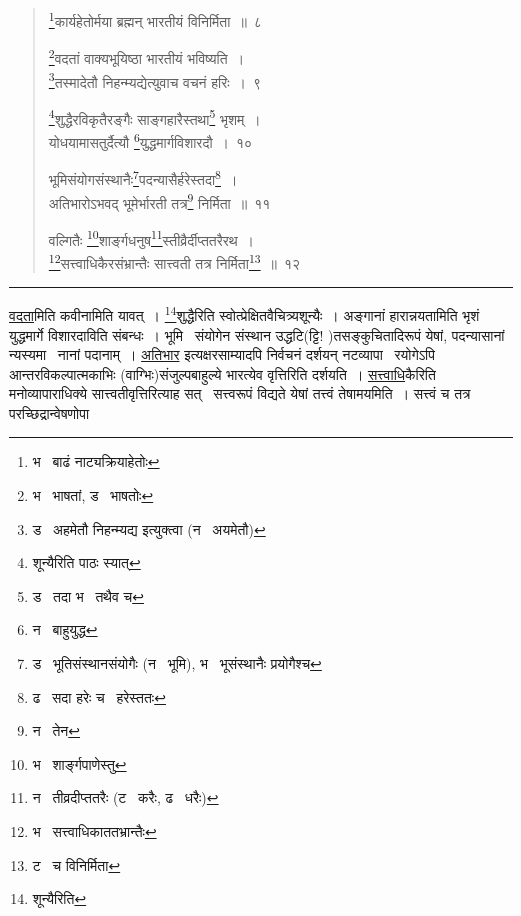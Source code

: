 \documentclass[11pt, openany]{book}
\begin{document}
\newpage

\begin{quote}
{\na \renewcommand{\thefootnote}{1}\footnote{भ \textendash\ बाढं नाट्यक्रियाहेतोः}कार्यहेतोर्मया ब्रह्मन् भारतीयं विनिर्मिता~॥~८

\renewcommand{\thefootnote}{2}\footnote{भ \textendash\ भाषतां, ड \textendash\ भाषतोः}वदतां वाक्यभूयिष्ठा भारतीयं भविष्यति~।\\
\renewcommand{\thefootnote}{3}\footnote{ड \textendash\ अहमेतौ निहन्म्यद्य इत्युक्त्वा (न \textendash\ अयमेतौ)}तस्मादेतौ निहन्म्यद्येत्युवाच वचनं हरिः~।~९

\renewcommand{\thefootnote}{4}\footnote{शून्यैरिति पाठः स्यात्}शुद्धैरविकृतैरङ्गैः साङ्गहारैस्तथा\renewcommand{\thefootnote}{5}\footnote{ड \textendash\ तदा भ \textendash\ तथैव च} भृशम्~।\\
योधयामासतुर्दैत्यौ \renewcommand{\thefootnote}{6}\footnote{न \textendash\ बाहुयुद्ध}युद्धमार्गविशारदौ~।~१०

भूमिसंयोगसंस्थानैः\renewcommand{\thefootnote}{7}\footnote{ड \textendash\ भूतिसंस्थानसंयोगैः (न \textendash\ भूमि), भ \textendash\ भूसंस्थानैः प्रयोगैश्च}पदन्यासैर्हरेस्तदा\renewcommand{\thefootnote}{8}\footnote{ढ \textendash\ सदा हरेः च \textendash\ हरेस्ततः}~।\\
अतिभारोऽभवद् भूमेर्भारती तत्र\renewcommand{\thefootnote}{9}\footnote{न \textendash\ तेन} निर्मिता~॥~११

वल्गितैः \renewcommand{\thefootnote}{10}\footnote{भ \textendash\ शार्ङ्गपाणेस्तु}शार्ङ्गधनुष\renewcommand{\thefootnote}{11}\footnote{न \textendash\ तीव्रदीप्ततरैः (ट \textendash\ करैः, ढ \textendash\ धरैः)}स्तीव्रैर्दीप्ततरैरथ~।\\
\renewcommand{\thefootnote}{12}\footnote{भ \textendash\ सत्त्वाधिकाततभ्रान्तैः}सत्त्वाधिकैरसंभ्रान्तैः सात्त्वती तत्र निर्मिता\renewcommand{\thefootnote}{13}\footnote{ट \textendash\ च विनिर्मिता}~॥~१२}
\end{quote}

\hrule

\vspace{2mm}
\noindent
\underline{वदता}मिति कवीनामिति यावत्~। \renewcommand{\thefootnote}{1}\footnote{शून्यैरिति}शुद्धैरिति स्वोत्प्रेक्षितवैचित्र्यशून्यैः~। अङ्गानां हारान्नयतामिति भृशं युद्धमार्गे विशारदाविति संबन्धः~। भूमि \textendash\ संयोगेन संस्थान उद्धटि(ट्टि! )तसङ्कुचितादिरूपं येषां, पदन्यासानां न्यस्यमा \textendash\ नानां पदानाम्~। \underline{अतिभार} इत्यक्षरसाम्यादपि निर्वचनं दर्शयन् नटव्यापा \textendash\ रयोगेऽपि आन्तरविकल्पात्मकाभिः (वाग्भिः)संजुल्पबाहुल्ये भारत्येव वृत्तिरिति दर्शयति~। \underline{सत्त्वाधि}कैरिति मनोव्यापाराधिक्ये सात्त्वतीवृत्तिरित्याह सत् \textendash\ सत्त्वरूपं विद्यते येषां तत्त्वं तेषामयमिति~। सत्त्वं च तत्र परच्छिद्रान्वेषणोपा \textendash
\end{document}

